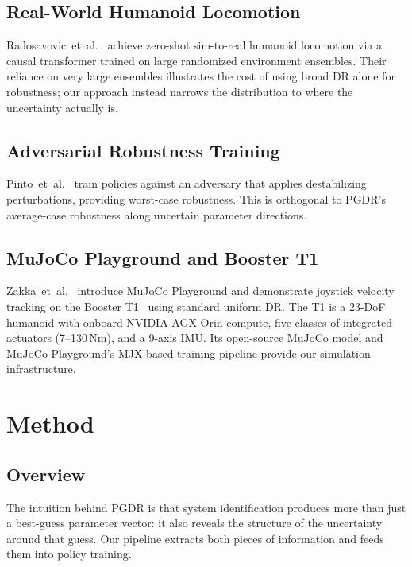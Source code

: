\documentclass[10pt,twocolumn]{article}
\begin{document}
\subsection{Real-World Humanoid Locomotion}

Radosavovic~et~al.~\cite{radosavovic2024humanoid} achieve zero-shot sim-to-real humanoid locomotion via a causal transformer trained on large randomized environment ensembles.
Their reliance on very large ensembles illustrates the cost of using broad DR alone for robustness; our approach instead narrows the distribution to where the uncertainty actually is.

\subsection{Adversarial Robustness Training}

Pinto~et~al.~\cite{pinto2017robust} train policies against an adversary that applies destabilizing perturbations, providing worst-case robustness.
This is orthogonal to PGDR's average-case robustness along uncertain parameter directions.

\subsection{MuJoCo Playground and Booster T1}

Zakka~et~al.~\cite{zakka2025playground} introduce MuJoCo Playground and demonstrate joystick velocity tracking on the Booster T1~\cite{boostert1} using standard uniform DR.
The T1 is a 23-DoF humanoid with onboard NVIDIA AGX Orin compute, five classes of integrated actuators (7--130\,Nm), and a 9-axis IMU.
Its open-source MuJoCo model and MuJoCo Playground's MJX-based training pipeline provide our simulation infrastructure.

\section{Method}

\subsection{Overview}

The intuition behind PGDR is that system identification produces more than just a best-guess parameter vector: it also reveals the structure of the uncertainty around that guess.
Our pipeline extracts both pieces of information and feeds them into policy training.
\end{document}
